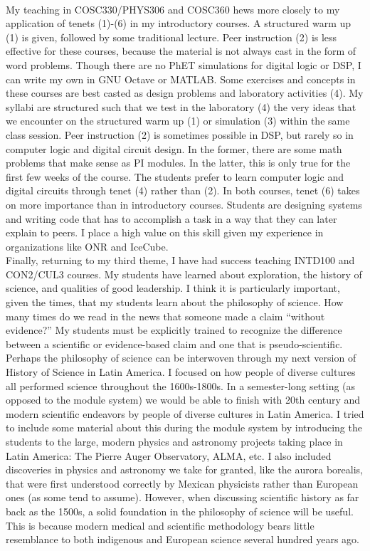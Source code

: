 \documentclass[../../../main.tex]{subfiles}
\begin{document}
\\
\vspace{0.25cm}
My teaching in COSC330/PHYS306 and COSC360 hews more closely to my application of tenets (1)-(6) in my introductory courses.  A structured warm up (1) is given, followed by some traditional lecture.  Peer instruction (2) is less effective for these courses, because the material is not always cast in the form of word problems.  Though there are no PhET simulations for digital logic or DSP, I can write my own in GNU Octave or MATLAB.  Some exercises and concepts in these courses are best casted as design problems and laboratory activities (4).  My syllabi are structured such that we test in the laboratory (4) the very ideas that we encounter on the structured warm up (1) or simulation (3) within the same class session.  Peer instruction (2) is sometimes possible in DSP, but rarely so in computer logic and digital circuit design.  In the former, there are some math problems that make sense as PI modules.  In the latter, this is only true for the first few weeks of the course.  The students prefer to learn computer logic and digital circuits through tenet (4) rather than (2).  In both courses, tenet (6) takes on more importance than in introductory courses.  Students are designing systems and writing code that has to accomplish a task in a way that they can later explain to peers.  I place a high value on this skill given my experience in organizations like ONR and IceCube.
\\
\vspace{0.25cm}
Finally, returning to my third theme, I have had success teaching INTD100 and CON2/CUL3 courses.  My students have learned about exploration, the history of science, and qualities of good leadership.  I think it is particularly important, given the times, that my students learn about the philosophy of science.  How many times do we read in the news that someone made a claim ``without evidence?''  My students must be explicitly trained to recognize the difference between a scientific or evidence-based claim and one that is pseudo-scientific.  Perhaps the philosophy of science can be interwoven through my next version of History of Science in Latin America.  I focused on how people of diverse cultures all performed science throughout the 1600s-1800s.  In a semester-long setting (as opposed to the module system) we would be able to finish with 20th century and modern scientific endeavors by people of diverse cultures in Latin America.  I tried to include some material about this during the module system by introducing the students to the large, modern physics and astronomy projects taking place in Latin America: The Pierre Auger Observatory, ALMA, etc.  I also included discoveries in physics and astronomy we take for granted, like the aurora borealis, that were first understood correctly by Mexican physicists rather than European ones (as some tend to assume).  However, when discussing scientific history as far back as the 1500s, a solid foundation in the philosophy of science will be useful.  This is because modern medical and scientific methodology bears little resemblance to both indigenous and European science several hundred years ago.
\end{document}
